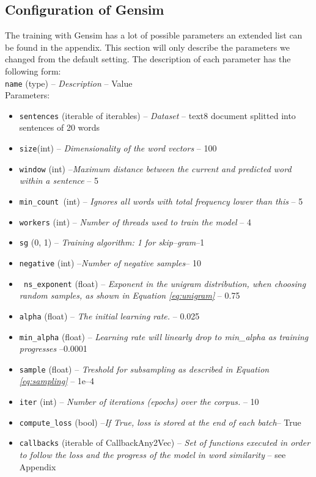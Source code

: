 \subsection{Configuration of Gensim}
The training with Gensim has a lot of possible parameters an extended list can be found in the appendix. This section will only describe the parameters we changed from the default setting.  The description of each parameter has the following form: \\
\texttt{name} (type) -- \textit{Description} -- Value\\
Parameters:
\begin{itemize}
   \item \texttt{sentences} (iterable of iterables) -- \textit{Dataset} -- text8 document splitted into sentences of 20 words 
  \item \texttt{size}(int) – \textit{Dimensionality of the word vectors } -- 100
\item \texttt{window} (int) --\textit {Maximum distance between the current and predicted word within a sentence }-- 5
  \item  \texttt{min\_count }(int) --\textit{ Ignores all words with total frequency lower than this }-- 5
 \item   \texttt{workers} (int) -- \textit{ Number of threads used to train the model} -- 4 
\item    \texttt{sg} ({0, 1}) --\textit{ Training algorithm: 1 for skip--gram}--1
  \item  \texttt{negative} (int) --\textit{Number of negative samples}-- 10 
\item   \texttt{ ns\_exponent} (float) --\textit{ Exponent in the unigram distribution, when choosing random samples, as shown in Equation \ref{eq:unigram} }-- 0.75
\item    \texttt{alpha} (float) --\textit{ The initial learning rate. }-- 0.025
 \item   \texttt{min\_alpha} (float) --\textit{ Learning rate will linearly drop to min\_alpha as training progresses }--0.0001
 \item   \texttt{sample} (float) --\textit{ Treshold for subsampling as described in Equation \ref{eq:sampling}} -- 1e--4
  \item  \texttt{iter} (int) --\textit{ Number of iterations (epochs) over the corpus. }-- 10 
 \
  \item  \texttt{compute\_loss} (bool) --\textit{If True, loss is stored at the end of each batch}-- True
 \item   \texttt{callbacks} (iterable of CallbackAny2Vec) --\textit{ Set of functions executed in order to follow the loss and the progress of the model in word similarity  }-- see Appendix
\end{itemize}

